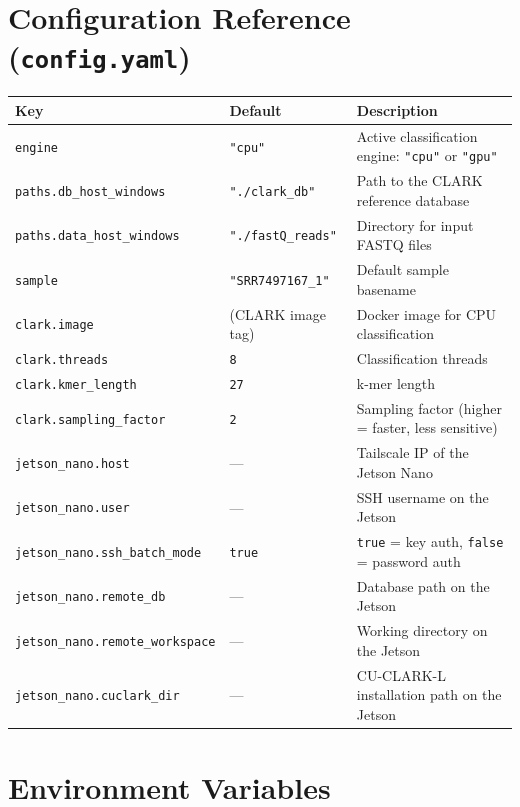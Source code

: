 \documentclass[12pt,a4paper]{report}
\begin{document}
\section{Configuration Reference (\texttt{config.yaml})}

\begin{longtable}{p{5cm} p{3cm} p{5.5cm}}
  \toprule
  \textbf{Key} & \textbf{Default} & \textbf{Description} \\
  \midrule
  \endhead
  \texttt{engine} & \texttt{"cpu"} & Active classification engine: \texttt{"cpu"} or \texttt{"gpu"} \\
  \texttt{paths.db\_host\_windows} & \texttt{"./clark\_db"} & Path to the CLARK reference database \\
  \texttt{paths.data\_host\_windows} & \texttt{"./fastQ\_reads"} & Directory for input FASTQ files \\
  \texttt{sample} & \texttt{"SRR7497167\_1"} & Default sample basename \\
  \texttt{clark.image} & (CLARK image tag) & Docker image for CPU classification \\
  \texttt{clark.threads} & \texttt{8} & Classification threads \\
  \texttt{clark.kmer\_length} & \texttt{27} & k-mer length \\
  \texttt{clark.sampling\_factor} & \texttt{2} & Sampling factor (higher = faster, less sensitive) \\
  \texttt{jetson\_nano.host} & — & Tailscale IP of the Jetson Nano \\
  \texttt{jetson\_nano.user} & — & SSH username on the Jetson \\
  \texttt{jetson\_nano.ssh\_batch\_mode} & \texttt{true} & \texttt{true} = key auth, \texttt{false} = password auth \\
  \texttt{jetson\_nano.remote\_db} & — & Database path on the Jetson \\
  \texttt{jetson\_nano.remote\_workspace} & — & Working directory on the Jetson \\
  \texttt{jetson\_nano.cuclark\_dir} & — & CU-CLARK-L installation path on the Jetson \\
  \bottomrule
\end{longtable}

\section{Environment Variables}
\end{document}
